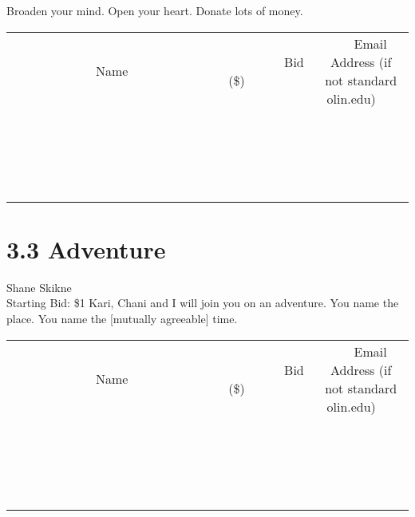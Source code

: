 \documentclass[11pt]{article}
\begin{document}
Broaden your mind. Open your heart. Donate lots of money.
\\[3ex]
\begin{tabular}{c c c}
~~~~~~~~~~~~~Name~~~~~~~~~~~~~ & ~~~~~~~~~Bid (\$)~~~~~~~~~  & ~~~Email Address (if not standard olin.edu)~~~\\
 & & \\
\hline
 & & \\
\hline
 & & \\
\hline
 & & \\
\hline
 & & \\
\hline
 & & \\
\hline
 & & \\
\hline
 & & \\
\hline
 & & \\
\hline
 & & \\
\hline
 & & \\
\hline
 & & \\
\hline
 & & \\
\hline
 & & \\
\hline
 & & \\
\hline
 & & \\
\hline
 & & \\
\hline
 & & \\
\hline
 & & \\
\hline
\end{tabular}
\newpage
\section*{3.3 Adventure}
Shane Skikne
\\
Starting Bid: \$1
\newline
Kari, Chani and I will join you on an adventure. You name the place. You name the [mutually agreeable] time.
\\[3ex]
\begin{tabular}{c c c}
~~~~~~~~~~~~~Name~~~~~~~~~~~~~ & ~~~~~~~~~Bid (\$)~~~~~~~~~  & ~~~Email Address (if not standard olin.edu)~~~\\
 & & \\
\hline
 & & \\
\hline
 & & \\
\hline
 & & \\
\hline
 & & \\
\hline
 & & \\
\hline
 & & \\
\hline
 & & \\
\hline
 & & \\
\hline
 & & \\
\hline
 & & \\
\hline
 & & \\
\hline
 & & \\
\hline
 & & \\
\hline
 & & \\
\hline
 & & \\
\hline
 & & \\
\hline
 & & \\
\hline
 & & \\
\hline
\end{tabular}
\newpage
\end{document}
